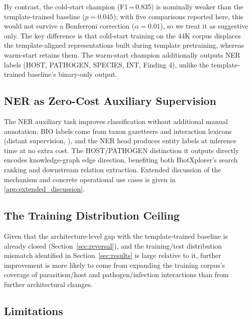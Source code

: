 \documentclass[a4paper,fleqn]{cas-sc}
\begin{document}
By contrast, the cold-start champion (F1\,=\,0.835) is nominally weaker
than the template-trained baseline ($p{=}0.045$); with five comparisons
reported here, this would not survive a Bonferroni correction
($\alpha{=}0.01$), so we treat it as suggestive only.
The key difference is that cold-start training on the 44K corpus
displaces the template-aligned representations built during template
pretraining, whereas warm-start retains them. The warm-start champion
additionally outputs NER labels (HOST, PATHOGEN, SPECIES, INT, Finding 4),
unlike the template-trained baseline's binary-only output.

\subsection{NER as Zero-Cost Auxiliary Supervision}
\label{sec:zerocost}

The NER auxiliary task improves classification without additional manual
annotation: BIO labels \citep{ramshaw1995text} come from taxon gazetteers
and interaction lexicons (distant supervision, \citep{mintz2009distant}),
and the NER head produces entity labels at inference time at no extra
cost. The HOST/PATHOGEN distinction it outputs directly encodes
knowledge-graph edge direction, benefiting both BiotXplorer's
search ranking and downstream relation extraction. Extended discussion
of the mechanism and concrete operational use cases is given in
\ref{app:extended_discussion}.

\subsection{The Training Distribution Ceiling}

Given that the architecture-level gap with the template-trained baseline is
already closed (Section~\ref{sec:reversal}), and the training/test
distribution mismatch identified in Section~\ref{sec:results} is large
relative to it, further improvement is more likely to come from
expanding the training corpus's coverage of parasitism/host and
pathogen/infection interactions than from further architectural changes.

\subsection{Limitations}
\label{sec:limitations}
\end{document}
